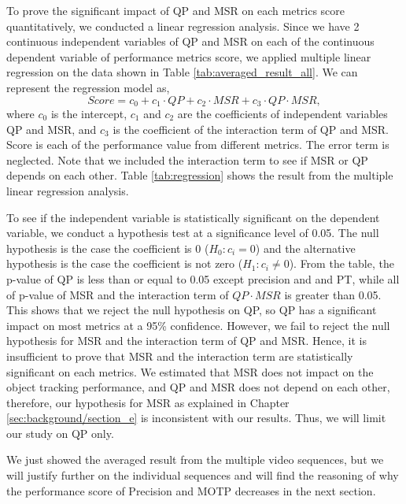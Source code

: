 
To prove the significant impact of QP and MSR on each metrics score quantitatively, we conducted a linear regression analysis. Since we have 2 continuous independent variables of QP and MSR on each of the continuous dependent variable of performance metrics score, we applied multiple linear regression on the data shown in Table \ref{tab:averaged_result_all}. We can represent the regression model as,
\begin{equation}
Score = \mathit{c_0} + \mathit{c_1} \cdot QP + \mathit{c_2} \cdot MSR + \mathit{c_3} \cdot QP \cdot MSR,
\end{equation}
where $\mathit{c_0}$ is the intercept, $\mathit{c_1}$ and $\mathit{c_2}$ are the coefficients of independent variables QP and MSR, and $\mathit{c_3}$ is the coefficient of the interaction term of QP and MSR. Score is each of the performance value from different metrics. The error term is neglected. Note that we included the interaction term to see if MSR or QP depends on each other. Table \ref{tab:regression} shows the result from the multiple linear regression analysis.

To see if the independent variable is statistically significant on the dependent variable, we conduct a hypothesis test at a significance level of 0.05. The null hypothesis is the case the coefficient is 0 ($H_0: c_i = 0$) and the alternative hypothesis is the case the coefficient is not zero ($H_1: c_i \neq 0$). From the table, the p-value of QP is less than or equal to 0.05 except precision and and PT, while all of p-value of MSR and the interaction term of $QP \cdot MSR$ is greater than 0.05. This shows that we reject the null hypothesis on QP, so QP has a significant impact on most metrics at a 95\% confidence. However, we fail to reject the null hypothesis for MSR and the interaction term of QP and MSR. Hence, it is insufficient to prove that MSR and the interaction term are statistically significant on each metrics. We estimated that MSR does not impact on the object tracking performance, and QP and MSR does not depend on each other, therefore, our hypothesis for MSR as explained in Chapter \ref{sec:background/section_e} is inconsistent with our results. Thus, we will limit our study on QP only.

We just showed the averaged result from the multiple video sequences, but we will justify further on the individual sequences and will find the reasoning of why the performance score of Precision and MOTP decreases in the next section.

